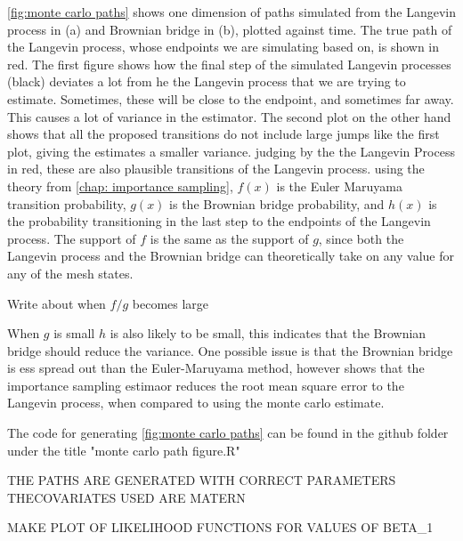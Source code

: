 \ref{fig:monte carlo paths} shows one dimension of paths simulated from the Langevin process in (a) and Brownian bridge in (b), plotted against time. The true path of the Langevin process, whose endpoints we are simulating based on, is shown in red. The first figure shows how the final step of the simulated Langevin processes (black) deviates a lot from he the Langevin process that we are trying to estimate. Sometimes, these will be close to the endpoint, and sometimes far away. This causes a lot of variance in the estimator. The second plot on the other hand shows that all the proposed transitions do not include large jumps like the first plot, giving the estimates a smaller variance. judging by the the Langevin Process in red, these are also plausible transitions of the Langevin process. using the theory from \ref{chap: importance sampling}, $f(x)$ is the Euler Maruyama transition probability, $g(x)$ is the Brownian bridge probability, and $h(x)$ is the probability transitioning in the last step to the endpoints of the Langevin process. The support of $f$ is the same as the support of $g$, since both the Langevin process and the Brownian bridge can theoretically take on any value for any of the mesh states.


Write about when $f/g$ becomes large

When $g$ is small $h$ is also likely to be small, this indicates that the Brownian bridge should reduce the variance. One possible issue is that the Brownian bridge is ess spread out than the Euler-Maruyama method, \parencite{durham_numerical_2002} however shows that the importance sampling estimaor reduces the root mean square error to the Langevin process, when compared to using the monte carlo estimate.


The code for generating \ref{fig:monte carlo paths} can be found in the github folder under the title "monte carlo path figure.R"


THE PATHS ARE GENERATED WITH CORRECT PARAMETERS
THECOVARIATES USED ARE MATERN

MAKE PLOT OF LIKELIHOOD FUNCTIONS FOR VALUES OF BETA_1














